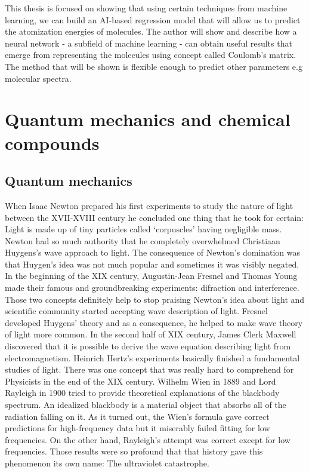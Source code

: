 \documentclass[a4paper,oneside,openright,11pt]{book}
\begin{document}
This thesis is focused on showing that using certain techniques from machine learning, we can build an AI-based regression model that will allow us to predict the atomization energies of molecules. The author will show and describe how a neural network - a subfield of machine learning - can obtain useful results that emerge from representing the molecules using concept called Coulomb's matrix. The method that will be shown is flexible enough to predict other parameters e.g molecular spectra.

\chapter{Quantum mechanics and chemical compounds}

\section{Quantum mechanics}

When Isaac Newton prepared his first experiments to study the nature of light between the XVII-XVIII century he concluded one thing that he took for certain: Light is made up of tiny particles called ‘corpuscles’ having negligible mass. Newton had so much authority that he completely overwhelmed Christiaan Huygens's wave approach to light. The consequence of Newton's domination was that Huygen's idea was not much popular and sometimes it was visibly negated. In the beginning of the XIX century, Augustin-Jean Fresnel and Thomas Young made their famous and groundbreaking experiments: difraction and interference. Those two concepts definitely help to stop praising Newton's idea about light and scientific community started accepting wave description of light. Fresnel developed Huygens' theory and as a consequence, he helped to make wave theory of light more common. In the second half of XIX century, James Clerk Maxwell discovered that it is possible to derive the wave equation describing light from electromagnetism. Heinrich Hertz's experiments basically finished a fundamental studies of light. There was one concept that was really hard to comprehend for Physicists in the end of the XIX century. Wilhelm Wien in 1889 and Lord Rayleigh in 1900 tried to provide theoretical explanations of the blackbody spectrum. An idealized blackbody is a material object that absorbs all of the radiation falling on it. As it turned out, the Wien's formula gave correct predictions for high-frequency data but it miserably failed fitting for low frequencies. On the other hand, Rayleigh's attempt was correct except for low frequencies. Those results were so profound that that history gave this phenomenon its own name: The ultraviolet catastrophe.
\end{document}
